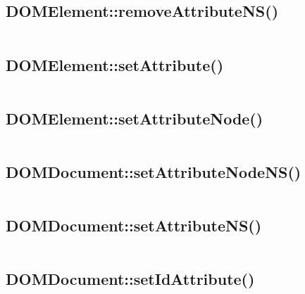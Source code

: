 \subsection{DOMElement::removeAttributeNS()}

\begin{lstlisting}[language=PHP]

\end{lstlisting}

\subsection{DOMElement::setAttribute()}

\begin{lstlisting}[language=PHP]

\end{lstlisting}

\subsection{DOMElement::setAttributeNode()}

\begin{lstlisting}[language=PHP]

\end{lstlisting}


\subsection{DOMDocument::setAttributeNodeNS()}

\begin{lstlisting}[language=PHP]

\end{lstlisting}

\subsection{DOMDocument::setAttributeNS()}

\begin{lstlisting}[language=PHP]

\end{lstlisting}


\subsection{DOMDocument::setIdAttribute()}


\begin{lstlisting}[language=PHP]

\end{lstlisting}


